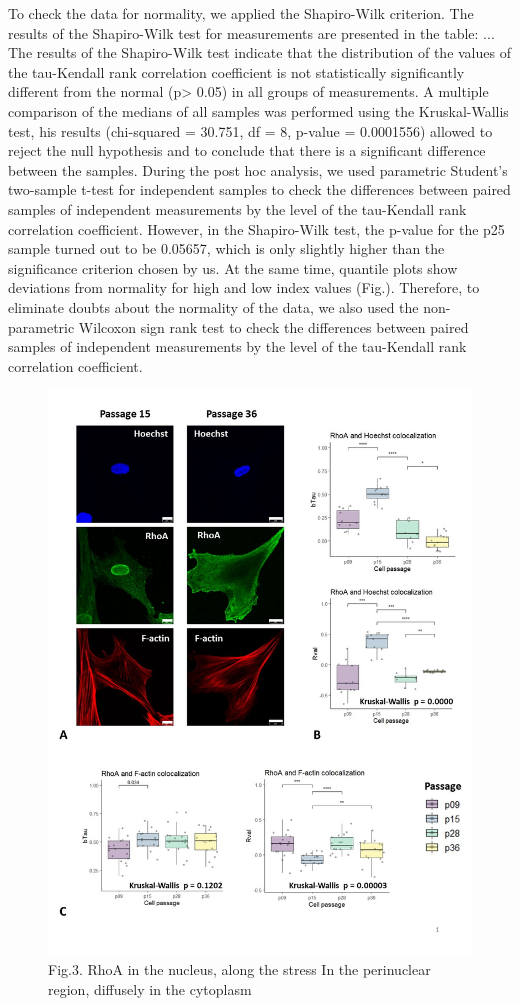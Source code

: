 \documentclass[english,authoryear]{elsarticle}
\begin{document}
To check the data for normality, we applied the Shapiro-Wilk criterion.
The results of the Shapiro-Wilk test for measurements are presented in the table:
...
The results of the Shapiro-Wilk test indicate that the distribution of the values of the tau-Kendall rank correlation coefficient is not statistically significantly different from the normal (p> 0.05) in all groups of measurements. A multiple comparison of the medians of all samples was performed using the Kruskal-Wallis test, his results (chi-squared = 30.751, df = 8, p-value = 0.0001556) allowed to reject the null hypothesis and to conclude that there is a significant difference between the samples.
 During the post hoc analysis, we used parametric Student’s two-sample t-test for independent samples to check the differences between paired samples of independent measurements by the level of the tau-Kendall rank correlation coefficient.
However, in the Shapiro-Wilk test, the p-value for the p25 sample turned out to be 0.05657, which is only slightly higher than the significance criterion chosen by us. At the same time, quantile plots show deviations from normality for high and low index values (Fig.).
Therefore, to eliminate doubts about the normality of the data, we also used the non-parametric Wilcoxon sign rank test to check the differences between paired samples of independent measurements by the level of the tau-Kendall rank correlation coefficient.


\begin{figure}
  \includegraphics[width=0.9\linewidth]{fig_rho-actin-col.jpg}
  \caption{Fig.3. RhoA in the nucleus, along the stress In the perinuclear region, diffusely in the cytoplasm}
  \label{rho-actin-col}
  \centering
\end{figure}
\end{document}

